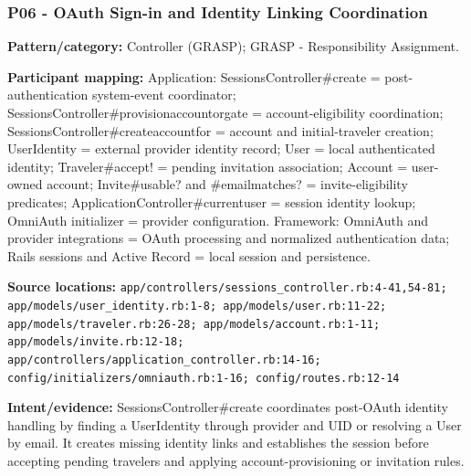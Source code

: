 \documentclass[11pt,a4paper]{article}
\renewcommand{\_}{\textunderscore\allowbreak}
\begin{document}
\subsubsection*{P06 - OAuth Sign-in and Identity Linking Coordination}
\textbf{Pattern/category:} Controller (GRASP); GRASP - Responsibility Assignment.\par
\textbf{Participant mapping:} Application: SessionsController\#create = post-authentication system-event coordinator; SessionsController\#provision\_account\_or\_gate = account-eligibility coordination; SessionsController\#create\_account\_for = account and initial-traveler creation; UserIdentity = external provider identity record; User = local authenticated identity; Traveler\#accept! = pending invitation association; Account = user-owned account; Invite\#usable? and \#email\_matches? = invite-eligibility predicates; ApplicationController\#current\_user = session identity lookup; OmniAuth initializer = provider configuration. Framework: OmniAuth and provider integrations = OAuth processing and normalized authentication data; Rails sessions and Active Record = local session and persistence.\par
\textbf{Source locations:} \nolinkurl{app/controllers/sessions_controller.rb:4-41,54-81; app/models/user_identity.rb:1-8; app/models/user.rb:11-22; app/models/traveler.rb:26-28; app/models/account.rb:1-11; app/models/invite.rb:12-18; app/controllers/application_controller.rb:14-16; config/initializers/omniauth.rb:1-16; config/routes.rb:12-14}\par
\textbf{Intent/evidence:} SessionsController\#create coordinates post-OAuth identity handling by finding a UserIdentity through provider and UID or resolving a User by email. It creates missing identity links and establishes the session before accepting pending travelers and applying account-provisioning or invitation rules.\par
\end{document}
